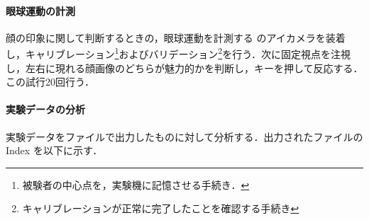 \paragraph{眼球運動の計測}
顔の印象に関して判断するときの，眼球運動を計測する
\elt のアイカメラを装着し，キャリブレーション\footnote{被験者の中心点を，実験機に記憶させる手続き．}およびバリデーション\footnote{キャリブレーションが正常に完了したことを確認する手続き}を行う．次に固定視点を注視し，左右に現れる顔画像のどちらが魅力的かを判断し，キーを押して反応する．この試行20回行う．
\paragraph{実験データの分析}
実験データを\csv ファイルで出力したものに対して分析する．出力された\csv ファイルのIndex を以下に示す．
\newcommand{\expos}{\texttt{expos}行列}
